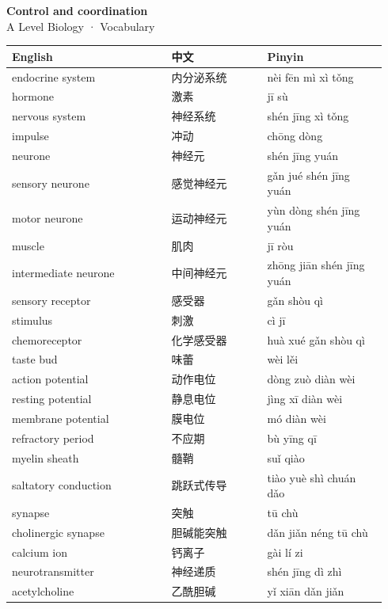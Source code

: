 \documentclass[11pt]{article}
\begin{document}
\begin{center}
  {\LARGE\bfseries Control and coordination}\\[0.35em]
  {\large A Level Biology · Vocabulary}
\end{center}
\vspace{0.6em}

\begin{longtable}{@{}p{0.40\linewidth}p{0.24\linewidth}p{0.30\linewidth}@{}}
\toprule
\textbf{English} & \textbf{中文} & \textbf{Pinyin} \\
\midrule
\endhead
\bottomrule
\endlastfoot
endocrine system & 内分泌系统 & nèi fēn mì xì tǒng \\
hormone & 激素 & jī sù \\
nervous system & 神经系统 & shén jīng xì tǒng \\
impulse & 冲动 & chōng dòng \\
neurone & 神经元 & shén jīng yuán \\
sensory neurone & 感觉神经元 & gǎn jué shén jīng yuán \\
motor neurone & 运动神经元 & yùn dòng shén jīng yuán \\
muscle & 肌肉 & jī ròu \\
intermediate neurone & 中间神经元 & zhōng jiān shén jīng yuán \\
sensory receptor & 感受器 & gǎn shòu qì \\
stimulus & 刺激 & cì jī \\
chemoreceptor & 化学感受器 & huà xué gǎn shòu qì \\
taste bud & 味蕾 & wèi lěi \\
action potential & 动作电位 & dòng zuò diàn wèi \\
resting potential & 静息电位 & jìng xī diàn wèi \\
membrane potential & 膜电位 & mó diàn wèi \\
refractory period & 不应期 & bù yīng qī \\
myelin sheath & 髓鞘 & suǐ qiào \\
saltatory conduction & 跳跃式传导 & tiào yuè shì chuán dǎo \\
synapse & 突触 & tū chù \\
cholinergic synapse & 胆碱能突触 & dǎn jiǎn néng tū chù \\
calcium ion & 钙离子 & gài lí zi \\
neurotransmitter & 神经递质 & shén jīng dì zhì \\
acetylcholine & 乙酰胆碱 & yǐ xiān dǎn jiǎn \\

\end{longtable}
\end{document}
